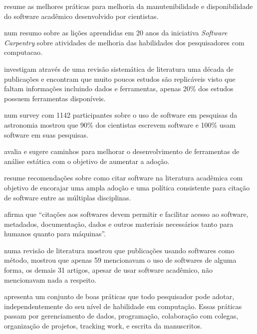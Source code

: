  resume as melhores práticas para melhoria da
manutenibilidade e disponibilidade do software acadêmico desenvolvido por
cientistas.

 num resumo sobre as lições aprendidas em 20
anos da iniciativa {\it Software Carpentry} sobre atividades de melhoria das
habilidades dos pesquisadores com computacao.

investigam através de uma revisão sistemática de literatura uma década de
publicações e encontram que muito poucos estudos são replicáveis visto que
faltam informações incluindo dados e ferramentas, apenas 20\% dos estudos
possuem ferramentas disponíveis.

num survey com 1142 participantes sobre o uso de software em pesquisas da
astronomia mostrou que 90\% dos cientistas escrevem software e 100\% usam
software em suas pesquisas.

 avalia e sugere caminhos para melhorar o
desenvolvimento de ferramentas de análise estática com o objetivo de aumentar a
adoção.

 resume recomendações sobre como citar software
na literatura acadêmica com objetivo de encorajar uma ampla adoção e uma
política consistente para citação de software entre as múltiplas disciplinas.

 afirma que ``citações aos softwares devem
permitir e facilitar acesso ao software, metadados, documentação, dados e
outros materiais necessários tanto para humanos quanto para máquinas''.


numa revisão de literatura mostrou que publicações usando softwares como
método, mostrou que apenas 59 mencionavam o uso de softwares de alguma forma,
os demais 31 artigos, apesar de usar software acadêmico, não mencionavam nada a
respeito.

 apresenta um conjunto de boas práticas que todo
pesquisador pode adotar, independentemente do seu nível de habilidade em
computação. Essas práticas passam por gerenciamento de dados, programação,
colaboração com colegas, organização de projetos, tracking work, e escrita da
manuscritos.


